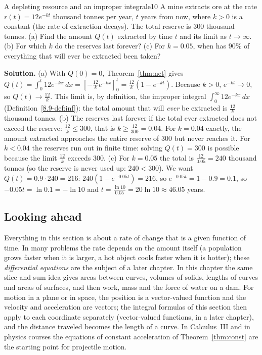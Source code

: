 \documentclass[11pt]{article}
\begin{document}
\begin{exmp}{A depleting resource and an improper integral}{e10}
A mine extracts ore at the rate $r(t)=12e^{-kt}$ thousand tonnes per year, $t$ years from now, where $k>0$ is a constant (the rate of extraction decays). The total reserve is $300$ thousand tonnes. (a) Find the amount $Q(t)$ extracted by time $t$ and its limit as $t\to\infty$. (b) For which $k$ do the reserves last forever? (c) For $k=0.05$, when has $90\%$ of everything that will ever be extracted been taken?

\textbf{Solution.} (a) With $Q(0)=0$, Theorem~\ref{thm:net} gives $Q(t)=\int_0^t12e^{-kx}\,dx=\left[-\frac{12}ke^{-kx}\right]_0^t=\frac{12}k\left(1-e^{-kt}\right)$. Because $k>0$, $e^{-kt}\to0$, so $Q(t)\to\frac{12}k$. This limit is, by definition, the improper integral $\int_0^\infty12e^{-kx}\,dx$ (Definition~\ref{8.9-def:inf}): the total amount that will \emph{ever} be extracted is $\frac{12}k$ thousand tonnes.
(b) The reserves last forever if the total ever extracted does not exceed the reserve: $\frac{12}k\le300$, that is $k\ge\frac{12}{300}=0.04$. For $k=0.04$ exactly, the amount extracted approaches the entire reserve of $300$ but never reaches it. For $k<0.04$ the reserves run out in finite time: solving $Q(t)=300$ is possible because the limit $\frac{12}k$ exceeds $300$.
(c) For $k=0.05$ the total is $\frac{12}{0.05}=240$ thousand tonnes (so the reserve is never used up: $240<300$). We want $Q(t)=0.9\cdot240=216$: $240\left(1-e^{-0.05t}\right)=216$, so $e^{-0.05t}=1-0.9=0.1$, so $-0.05t=\ln0.1=-\ln10$ and $t=\frac{\ln10}{0.05}=20\ln10\approx46.05$ years.
\end{exmp}

\subsection*{Looking ahead}

Everything in this section is about a rate of change that is a given function of time. In many problems the rate depends on the amount itself (a population grows faster when it is larger, a hot object cools faster when it is hotter); these \emph{differential equations} are the subject of a later chapter. In this chapter the same slice-and-sum idea gives areas between curves, volumes of solids, lengths of curves and areas of surfaces, and then work, mass and the force of water on a dam. For motion in a plane or in space, the position is a vector-valued function and the velocity and acceleration are vectors; the integral formulas of this section then apply to each coordinate separately (vector-valued functions, in a later chapter), and the distance traveled becomes the length of a curve. In Calculus~III and in physics courses the equations of constant acceleration of Theorem~\ref{thm:const} are the starting point for projectile motion.
\end{document}
